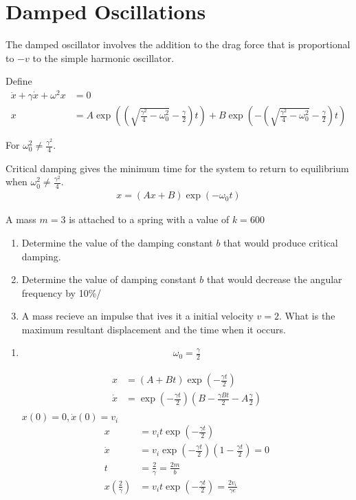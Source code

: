 \documentclass[a4paper]{article}
\numberwithin{equation}{section}
\begin{document}
\section{Damped Oscillations}

The damped oscillator involves the addition to the drag force that is proportional to $-v$ to the simple harmonic oscillator.

Define
\begin{align}
    \ddot x+\gamma\dot x+\omega^2x&=0\\
    x &= A\exp(\left(\sqrt{\frac{\gamma^2}{4}-\omega_0^2}-\frac{\gamma}{2}\right)t) + B\exp(-\left(\sqrt{\frac{\gamma^2}{4}-\omega_0^2}-\frac{\gamma}{2}\right)t)
\end{align}

For $\omega_0^2\neq\frac{\gamma^2}{4}$.

Critical damping gives the minimum time for the system to return to equilibrium when $\omega_0^2\neq\frac{\gamma^2}{4}$.
\begin{align}
    x=(Ax+B)\exp(-\omega_0 t)
\end{align}

\begin{example}
    A mass $m=3$ is attached to a spring with a value of $k=600$
    \begin{enumerate}
        \item Determine the value of the damping constant $b$ that would produce critical damping.
        \item Determine the value of damping constant $b$ that would decrease the angular frequency by 10\%/
        \item A mass recieve an impulse that ives it a initial velocity $v=2$. What is the maximum resultant displacement and the time when it occurs.
    \end{enumerate}
\end{example}
\begin{sol}
    \begin{enumerate}
        \item \begin{align}
            \omega_0=\frac{\gamma}{2}
        \end{align}

        \begin{align}
            x &= (A+Bt)\exp(-\frac{\gamma t}{2})\\
            \dot x&= \exp(-\frac{\gamma t}{2})\left(B-\frac{\gamma Bt}{2}-A\frac{\gamma}{2}\right)\\
        \end{align}
        $x(0)=0, \dot x(0)=v_i$
        \begin{align}
            x &=v_i t\exp(-\frac{\gamma t}{2})\\
            \dot x &= v_i\exp(-\frac{\gamma t}{2})\left(1-\frac{\gamma t}{2}\right) = 0\\
            t &= \frac{2}{\gamma}=\frac{2m}{b}\\
            x\left(\frac{2}{\gamma}\right)&=v_it\exp(-\frac{\gamma t}{2})=\frac{2v_i}{\gamma e}
        \end{align}
    \end{enumerate}
\end{sol}
\end{document}
